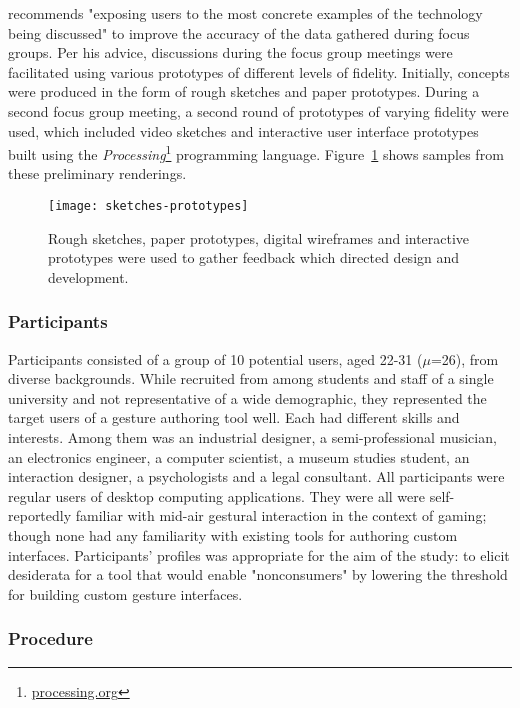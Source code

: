 \textcite{Nielsen:1997} recommends "exposing users to the most concrete examples of the technology being discussed" to improve the accuracy of the data gathered during focus groups. Per his advice, discussions during the focus group meetings were facilitated using various prototypes of different levels of fidelity. Initially, concepts were produced in the form of rough sketches and paper prototypes. During a second focus group meeting, a second round of prototypes of varying fidelity were used, which included video sketches and interactive user interface prototypes built using the \emph{Processing}\footnote{\href{http://www.processing.org}{processing.org}} programming language. Figure~\ref{fig:sketches-prototypes} shows samples from these preliminary renderings.

\begin{figure}[t]
\centering
\texttt{[image: sketches-prototypes]}
\caption{Rough sketches, paper prototypes, digital wireframes and interactive prototypes were used to gather feedback which directed design and development.}
\label{fig:sketches-prototypes}
\end{figure}

\subsubsection{Participants}

Participants consisted of a group of 10 potential users, aged 22-31 ($\mu$=26), from diverse backgrounds. While recruited from among students and staff of a single university and not representative of a wide demographic, they represented the target users of a gesture authoring tool well. Each had different skills and interests. Among them was an industrial designer, a semi-professional musician, an electronics engineer, a computer scientist, a museum studies student, an interaction designer, a psychologists and a legal consultant. All participants were regular users of desktop computing applications. They were all were self-reportedly familiar with mid-air gestural interaction in the context of gaming; though none had any familiarity with existing tools for authoring custom interfaces. Participants' profiles was appropriate for the aim of the study: to elicit desiderata for a tool that would enable "nonconsumers" \parencite{Christensen:2003, Fried:2008} by lowering the threshold for building custom gesture interfaces.

\subsubsection{Procedure}

